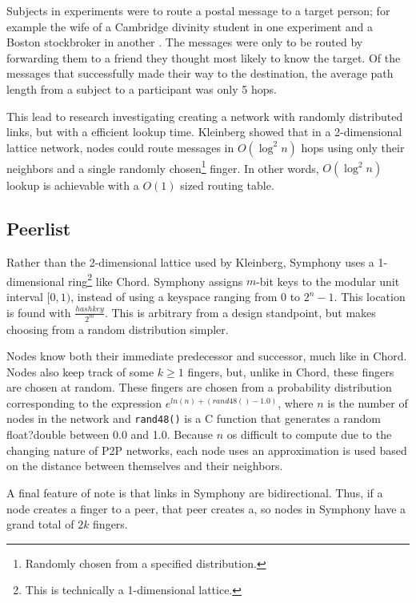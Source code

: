 Subjects in experiments were to route a postal message to a target person; for example the wife of a Cambridge divinity student in one experiment and a Boston stockbroker in another \cite{milgram1967small}.
The messages were only to be routed by forwarding them to a friend they thought most likely to know the target.
Of the messages that successfully made their way to the destination, the average path length from a subject to a participant was only 5 hops.  

This lead to research investigating creating a network with randomly distributed links, but with a efficient lookup time.
Kleinberg \cite{kleinberg2000navigation} showed that in a 2-dimensional lattice network, nodes could route messages in $O(\log^{2}n)$ hops using only their neighbors and a single randomly chosen\footnote{Randomly chosen from a specified distribution.} finger.
In other words, $O(\log^{2}n)$ lookup is achievable with a $O(1)$ sized routing table.

\subsection*{Peerlist}
Rather than the 2-dimensional lattice used by Kleinberg, Symphony uses a 1-dimensional ring\footnote{This is technically a 1-dimensional lattice.} like Chord.
Symphony assigns $m$-bit keys to the modular unit interval $ [0,1)$, instead of using a keyspace ranging from 0 to $2^{n} - 1$.
This location is found  with $\frac{hashkey}{2^{m}}$.
This is arbitrary from a design standpoint, but makes choosing from a random distribution simpler. 

Nodes know both their immediate predecessor and successor, much like in Chord.
Nodes also keep track of some  $k \geq 1$ fingers, but, unlike in Chord, these fingers are chosen at random.
These fingers are chosen from a probability distribution corresponding to the expression $e^{ln(n) + (rand48() - 1.0)}$, where $n$ is the number of nodes in the network and \texttt{rand48()} is a C function that generates a random float?double between 0.0 and 1.0.
Because $n$ os difficult to compute due to the changing nature of P2P networks, each node uses an approximation is used based on the distance between themselves and their neighbors.

A final feature of note is that links in Symphony are bidirectional.
Thus, if a node creates a finger to a peer, that peer creates a, so nodes in Symphony have a grand total of $2k$ fingers.


